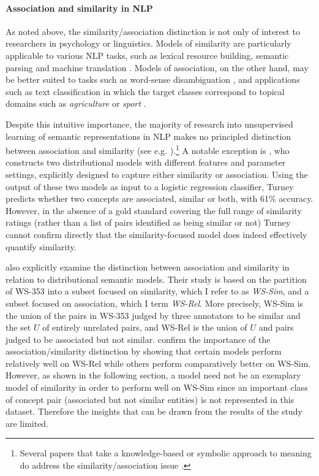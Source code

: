 \paragraph{Association and similarity in NLP}  As noted above, the similarity/association distinction is not only of interest to researchers in psychology or linguistics. Models of similarity are particularly applicable to various NLP tasks, such as lexical resource building, semantic parsing and machine translation \citep{he2008indirect,Haghighi2008Learning,marton2009improved,beltagysemantic}. Models of association, on the other hand, may be better suited to tasks such as word-sense disambiguation \citep{navigli2009word}, and applications such as text classification \citep{phan2008learning} in which the target classes correspond to topical domains such as \emph{agriculture} or \emph{sport} \citep{rose2002reuters}. 

Despite this intuitive importance, the majority of research into unsupervised learning of semantic representations in NLP makes no principled distinction between association and similarity (see e.g. \citep{huang2012improving,reisinger2010multi,luong2013better}).\footnote{Several papers that take a knowledge-based or symbolic approach to meaning do address the similarity/association issue \citep{budanitsky2006evaluating}.} A notable exception is \cite{turney2012domain}, who constructs two distributional models with different features and parameter settings, explicitly designed to capture either similarity or association. Using the output of these two models as input to a logistic regression classifier, Turney predicts whether two concepts are associated, similar or both, with 61\% accuracy. However, in the absence of a gold standard covering the full range of similarity ratings (rather than a list of pairs identified as being similar or not) Turney cannot confirm directly that the similarity-focused model does indeed effectively quantify similarity. 

\cite{agirre2009study} also explicitly examine the distinction between association and similarity in relation to distributional semantic models. Their study is based on the partition of WS-353 into a subset focused on similarity, which I refer to as \emph{WS-Sim}, and a subset focused on association, which I term \emph{WS-Rel}. More precisely, WS-Sim is the union of the pairs in WS-353 judged by three annotators to be similar and the set \(U\) of entirely unrelated pairs, and WS-Rel is the union of \(U\) and pairs judged to be associated but not similar. \cite{agirre2009study} confirm the importance of the association/similarity distinction by showing that certain models perform relatively well on WS-Rel while others perform comparatively better on WS-Sim. However, as shown in the following section, a model need not be an exemplary model of similarity in order to perform well on WS-Sim since an important class of concept pair (associated but not similar entities) is not represented in this dataset. Therefore the insights that can be drawn from the results of the \cite{agirre2009study} study are limited.  

